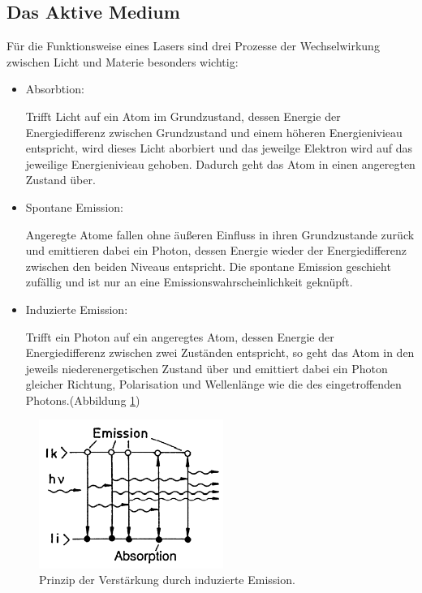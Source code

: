 \subsection{Das Aktive Medium}
Für die Funktionsweise eines Lasers sind drei Prozesse der Wechselwirkung zwischen Licht und Materie besonders wichtig:
\begin{itemize}
    \item Absorbtion:

    Trifft Licht auf ein Atom im Grundzustand, dessen Energie der Energiedifferenz zwischen Grundzustand und einem höheren Energienivieau entspricht, wird dieses Licht aborbiert und das jeweilge Elektron wird auf das jeweilige Energienivieau gehoben. Dadurch geht das Atom in einen angeregten Zustand über.

    \item Spontane Emission:

    Angeregte Atome fallen ohne äußeren Einfluss in ihren Grundzustande zurück und emittieren dabei ein Photon, dessen Energie wieder der Energiedifferenz zwischen den beiden Niveaus entspricht. Die spontane Emission geschieht zufällig und ist nur an eine Emissionswahrscheinlichkeit geknüpft. 

    \item Induzierte Emission:

    Trifft ein Photon auf ein angeregtes Atom, dessen Energie der Energiedifferenz zwischen zwei Zuständen entspricht, so geht das Atom in den jeweils niederenergetischen Zustand über und emittiert dabei ein Photon gleicher Richtung, Polarisation und Wellenlänge wie die des  eingetroffenden Photons.(Abbildung \ref{fig:ver})
\end{itemize}

\begin{figure}
    \centering
    \includegraphics[width=6cm]{Bilder/verstaerkung.PNG}
    \caption{Prinzip der Verstärkung durch induzierte Emission.\cite{Laserspektroskopie_1}}
    \label{fig:ver}
\end{figure}

